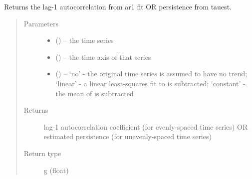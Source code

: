 \documentclass[letterpaper,10pt,english]{sphinxmanual}
\begin{document}
\begin{fulllineitems}
\label{\detokenize{Spectral:pyleoclim.Spectral.ar1_fit}}
Returns the lag-1 autocorrelation from ar1 fit OR persistence from tauest.
\begin{quote}\begin{description}
\item[{Parameters}] \leavevmode\begin{itemize}
\item {} 
 () -- the time series

\item {} 
 () -- the time axis of that series

\item {} 
 () -- `no' - the original time series is assumed to have no trend;
`linear' - a linear least-squares fit to  is subtracted;
`constant' - the mean of  is subtracted

\end{itemize}

\item[{Returns}] \leavevmode
lag-1 autocorrelation coefficient (for evenly-spaced time series)
OR estimated persistence (for unevenly-spaced time series)

\item[{Return type}] \leavevmode
g (float)

\end{description}\end{quote}

\end{fulllineitems}

\end{document}

